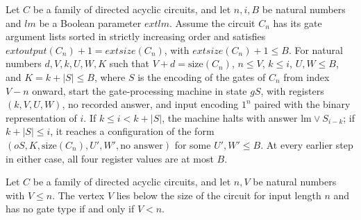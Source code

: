 \begin{lemma}
\label{BoolCircuit.AdjWalk.gLoop}
\leanok
{}
Let $C$ be a family of directed acyclic circuits, and let $n,i,B$ be natural numbers and
$lm$ be a Boolean parameter $	ext{lm}$. Assume the circuit $C_n$ has its gate argument
lists sorted in strictly increasing order and satisfies
$	ext{output}(C_n)+1=	ext{size}(C_n)$, with $	ext{size}(C_n)+1\le B$. For natural
numbers $d,V,k,U,W,K$ such that $V+d=\text{size}(C_n)$, $n\le V$, $k\le i$, $U,W\le B$,
and $K=k+|S|\le B$, where $S$ is the encoding of the gates of $C_n$ from index $V-n$
onward, start the gate-processing machine in state $gS$, with registers $(k,V,U,W)$, no
recorded answer, and input encoding $1^n$ paired with the binary representation of $i$.
If $k\le i<k+|S|$, the machine halts with answer $\text{lm}\lor S_{i-k}$; if $k+|S|\le
i$, it reaches a configuration of the form $(oS,K,\text{size}(C_n),U',W',\text{no
answer})$ for some $U',W'\le B$. At every earlier step in either case, all four register
values are at most $B$.
\end{lemma}

\begin{lemma}
\label{BoolCircuit.AdjWalk.vtype_none}
\leanok
{}
Let $C$ be a family of directed acyclic circuits, and let $n,V$ be natural numbers with
$V\le n$. The vertex $V$ lies below the size of the circuit for input length $n$ and has
no gate type if and only if $V<n$.
\end{lemma}

